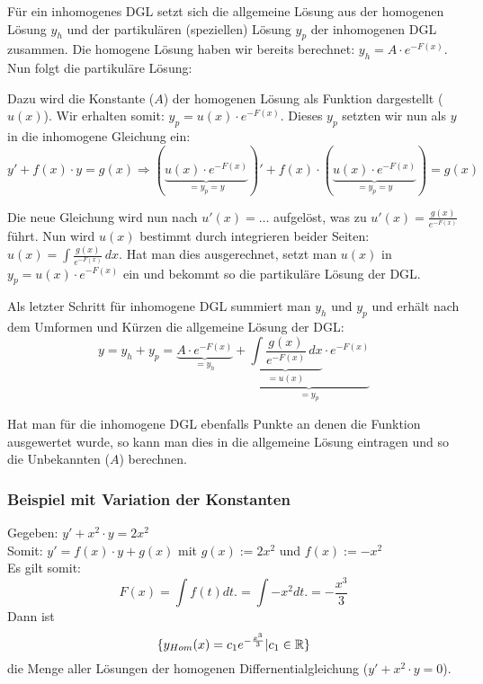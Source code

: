 Für ein inhomogenes DGL setzt sich die allgemeine Lösung aus der homogenen Lösung
$y_h$ und der partikulären (speziellen) Lösung $y_p$ der inhomogenen DGL zusammen.
Die homogene Lösung haben wir bereits berechnet: $y_h = A \cdot e^{-F(x)}$. Nun
folgt die partikuläre Lösung:

Dazu wird die Konstante ($A$) der homogenen Lösung als Funktion dargestellt ($u(x)$).
Wir erhalten somit: $y_p = u(x) \cdot e^{-F(x)}$.
Dieses $y_p$ setzten wir nun als $y$ in die inhomogene Gleichung ein:
{\small
\[
y' + f(x) \cdot y = g(x) \Rightarrow (\underbrace{u(x) \cdot e^{-F(x)}}_{= y_p = y})'
+ f(x) \cdot (\underbrace{u(x) \cdot e^{-F(x)}}_{= y_p = y}) = g(x)
\]
}

Die neue Gleichung wird nun nach $u'(x) = \ldots$ aufgelöst, was zu
$u'(x) = \frac{g(x)}{e^{-F(x)}}$ führt. Nun wird $u(x)$ bestimmt durch integrieren
beider Seiten: $u(x) = \int \frac{g(x)}{e^{-F(x)}}\,dx$. Hat man dies ausgerechnet,
setzt man $u(x)$ in $y_p = u(x) \cdot e^{-F(x)}$ ein und bekommt so die partikuläre
Lösung der DGL.

Als letzter Schritt für inhomogene DGL summiert man $y_h$ und $y_p$ und erhält nach
dem Umformen und Kürzen die allgemeine Lösung der DGL:
{\small
\[
y = y_h + y_p = 
\underbrace{A \cdot e^{-F(x)}}_{= y_h} +
\underbrace{\underbrace{\int \frac{g(x)}{e^{-F(x)}}\,dx}_{= u(x)} \cdot e^{-F(x)}}_{= y_p}
\]
}

Hat man für die inhomogene DGL ebenfalls Punkte an denen die Funktion ausgewertet wurde,
so kann man dies in die allgemeine Lösung eintragen und so die Unbekannten ($A$) berechnen.

\subsubsection{Beispiel mit Variation der Konstanten}
Gegeben: $y' + x^2 \cdot y = 2x^2$\\
Somit:  $y' = f(x) \cdot y + g(x)$ mit $g(x) := 2x^2$ und $f(x) :=  - x^2$\\
Es gilt somit:\[
F(x) = \int f(t) dt. =  \int - x^2 dt. = -\frac{x^3}{3}
\]
Dann ist \[
\{y_{Hom}(x) = c_1e^{-\frac{x^3}{3}}| c_1 \in \mathbb{R}\}
\] die Menge aller Lösungen der homogenen Differnentialgleichung ($y' + x^2\cdot y = 0$). \\



